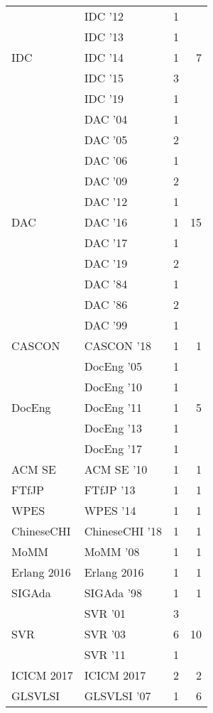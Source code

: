 \begin{table*}[t]
\begin{tabular}{llrr}
\multirow{5}{*}{IDC } & IDC '12 & 1 & \multirow{5}{*}{7}\\
& IDC '13 & 1 &\\
& IDC '14 & 1 &\\
& IDC '15 & 3 &\\
& IDC '19 & 1 &\\
\multirow{11}{*}{DAC } & DAC '04 & 1 & \multirow{11}{*}{15}\\
& DAC '05 & 2 &\\
& DAC '06 & 1 &\\
& DAC '09 & 2 &\\
& DAC '12 & 1 &\\
& DAC '16 & 1 &\\
& DAC '17 & 1 &\\
& DAC '19 & 2 &\\
& DAC '84 & 1 &\\
& DAC '86 & 2 &\\
& DAC '99 & 1 &\\
\multirow{1}{*}{CASCON } & CASCON '18 & 1 & \multirow{1}{*}{1}\\
\multirow{5}{*}{DocEng } & DocEng '05 & 1 & \multirow{5}{*}{5}\\
& DocEng '10 & 1 &\\
& DocEng '11 & 1 &\\
& DocEng '13 & 1 &\\
& DocEng '17 & 1 &\\
\multirow{1}{*}{ACM SE } & ACM SE '10 & 1 & \multirow{1}{*}{1}\\
\multirow{1}{*}{FTfJP } & FTfJP '13 & 1 & \multirow{1}{*}{1}\\
\multirow{1}{*}{WPES } & WPES '14 & 1 & \multirow{1}{*}{1}\\
\multirow{1}{*}{ChineseCHI } & ChineseCHI '18 & 1 & \multirow{1}{*}{1}\\
\multirow{1}{*}{MoMM } & MoMM '08 & 1 & \multirow{1}{*}{1}\\
\multirow{1}{*}{Erlang 2016} & Erlang 2016 & 1 & \multirow{1}{*}{1}\\
\multirow{1}{*}{SIGAda } & SIGAda '98 & 1 & \multirow{1}{*}{1}\\
\multirow{3}{*}{SVR } & SVR '01 & 3 & \multirow{3}{*}{10}\\
& SVR '03 & 6 &\\
& SVR '11 & 1 &\\
\multirow{1}{*}{ICICM 2017} & ICICM 2017 & 2 & \multirow{1}{*}{2}\\
\multirow{5}{*}{GLSVLSI } & GLSVLSI '07 & 1 & \multirow{5}{*}{6}\\

\end{tabular}
\end{table*}
